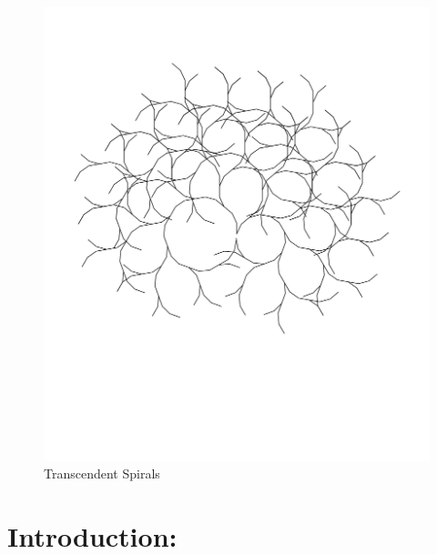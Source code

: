 \documentclass[12pt,twoside]{reedthesis}
\begin{document}
	
	\begin{figure}[h]
	\centering
	\includegraphics[clip=true, viewport=1in 3in 9in 10.5in, scale=0.6]{Images/Dedication1}
	\caption[Transcendent Spirals]{Transcendent Spirals\footnotemark}
	\label {Acknowledgements1}
	\end{figure}

  \mainmatter %
  \pagestyle{fancyplain} %

\chapter*{Introduction: }
	
\end{document}
